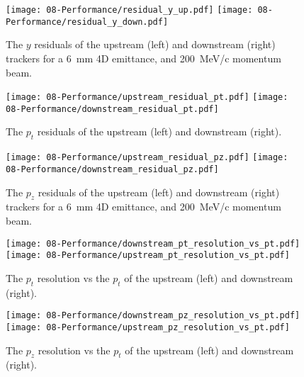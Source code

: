     \begin{figure}[p]
    \begin{center}
      \texttt{[image: 08-Performance/residual\_y\_up.pdf]}
      \texttt{[image: 08-Performance/residual\_y\_down.pdf]}
      \caption{\label{fig:YResidKalman} The $y$ residuals of the upstream (left) and downstream (right) trackers for a 6~mm 4D emittance, and 200~MeV/c momentum beam.}
    \end{center}
  \end{figure}
  
  
  \begin{figure}[p]
    \begin{center}
      \texttt{[image: 08-Performance/upstream\_residual\_pt.pdf]}
      \texttt{[image: 08-Performance/downstream\_residual\_pt.pdf]}
      \caption{\label{fig:PtResidKalman} The $p_t$ residuals of the upstream (left) and downstream (right).}
    \end{center}
  \end{figure}
  
   \begin{figure}[p]
    \begin{center}
      \texttt{[image: 08-Performance/upstream\_residual\_pz.pdf]}
      \texttt{[image: 08-Performance/downstream\_residual\_pz.pdf]}
      \caption{\label{fig:PzResidKalman} The $p_z$ residuals of the upstream (left) and downstream (right) trackers for a 6~mm 4D emittance, and 200~MeV/c momentum beam.}
    \end{center}
  \end{figure}
  
  \begin{figure}[p]
   \begin{center}
     \texttt{[image: 08-Performance/downstream\_pt\_resolution\_vs\_pt.pdf]}
     \texttt{[image: 08-Performance/upstream\_pt\_resolution\_vs\_pt.pdf]}
     \caption{\label{fig:PtPtResolKalman} The $p_t$ resolution vs the $p_t$ of the upstream (left) and downstream (right).}
   \end{center}
  \end{figure}
  
  \begin{figure}[p]
   \begin{center}
     \texttt{[image: 08-Performance/downstream\_pz\_resolution\_vs\_pt.pdf]}
     \texttt{[image: 08-Performance/upstream\_pz\_resolution\_vs\_pt.pdf]}
     \caption{\label{fig:PtPzResolKalman} The $p_z$ resolution vs the $p_t$ of the upstream (left) and downstream (right).}
   \end{center}
  \end{figure}